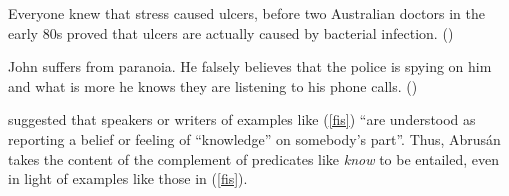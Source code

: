 \documentclass[11pt,fleqn]{article}
\newcommand{\6}{\mbox{$[\hspace*{-.6mm}[$}}
\newcommand{\9}{\mbox{$]\hspace*{-.6mm}]$}}
\begin{document}
\begin{exe}
\ex\label{fis}
\begin{xlist}

\ex Everyone knew that stress caused ulcers, before two Australian doctors in the early 80s proved that ulcers are actually caused by bacterial infection. \hfill (\citealt[501]{hazlett2010})

\ex John suffers from paranoia. He falsely believes that the police is spying on him and what is more he knows they are listening to his phone calls. \hfill (\citealt[514]{abrusan2011})



\end{xlist}

\end{exe}
\citet[515]{abrusan2011} suggested that speakers or writers of examples like (\ref{fis}) ``are understood as reporting a belief or feeling of ``knowledge'' on somebody's part''. Thus, Abrus\'an takes the content of the complement of predicates like {\em know} to be entailed, even in light of examples like those in (\ref{fis}). 
\end{document}
